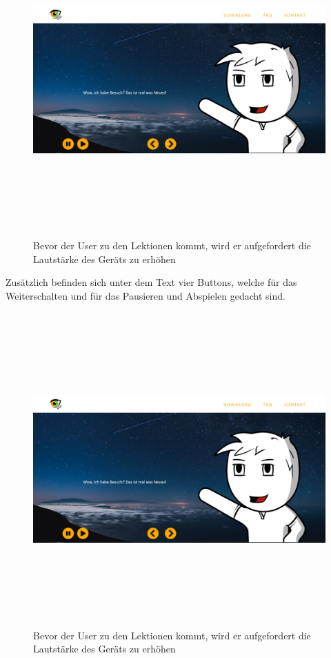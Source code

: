 \begin{figure}[H]
	\centering				\includegraphics[width=12cm,height=12cm,keepaspectratio]{webseite_abb9} 
	\caption{Bevor der User zu den Lektionen kommt, wird er aufgefordert die Lautstärke des Geräts zu erhöhen}
\end{figure}
Zusätzlich befinden sich unter dem Text vier Buttons, welche für das Weiterschalten und für das Pausieren und Abspielen gedacht sind. 
\begin{figure}[H]
	\centering				\includegraphics[width=12cm,height=12cm,keepaspectratio]{webseite_abb9} 
	\caption{Bevor der User zu den Lektionen kommt, wird er aufgefordert die Lautstärke des Geräts zu erhöhen}
\end{figure}

